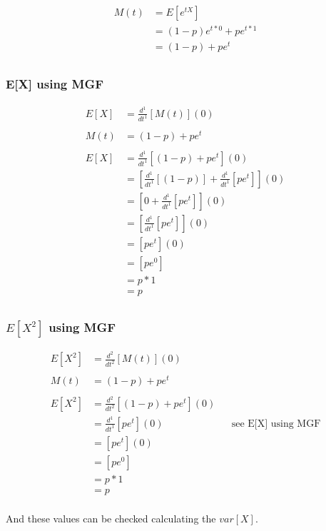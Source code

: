 \documentclass[]{book}
\begin{document}
\begin{align}
	M(t) &= E[e^{tX}]\\
	&= (1-p)e^{t*0} + pe^{t*1}\\
	&= (1-p) + pe^{t}\\
\end{align}

\subsubsection{E[X] using MGF}

\begin{align}
E[X] &= \frac{d^1}{dt^1}[M(t)](0)\\
\\
M(t) &= (1-p) + pe^{t}\\
\\
E[X] &= \frac{d^1}{dt^1}[(1-p) + pe^{t}](0)\\
&= [\frac{d^1}{dt^1}[(1-p)] + \frac{d^1}{dt^1}[pe^{t}]](0)\\
&= [0 + \frac{d^1}{dt^1}[pe^{t}]](0)\\
&= [\frac{d^1}{dt^1}[pe^{t}]](0)\\
&= [pe^{t}](0)\\
&= [pe^{0}]\\
&= p*1\\
&= p\\
\end{align}

\subsubsection{$E[X^2]$ using MGF}

\begin{align}
E[X^2] &= \frac{d^2}{dt^2}[M(t)](0)\\
\\
M(t) &= (1-p) + pe^{t}\\
\\
E[X^2] &= \frac{d^2}{dt^2}[(1-p) + pe^{t}](0)\\
&= \frac{d^1}{dt^1}[pe^{t}](0) && \text{see E[X] using MGF}\\
&= [pe^{t}](0)\\
&= [pe^{0}]\\
&= p*1\\
&= p\\
\end{align}

And these values can be checked calculating the $var[X]$.
\end{document}
